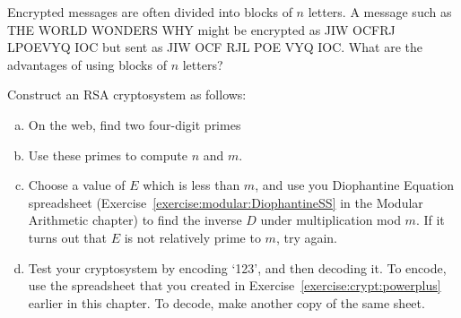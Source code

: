 % 
% 
% 
% 
% 
% 
% 
% 
% 
 
\begin{exercise}{} 
Encrypted messages are often divided into blocks of $n$ letters. A
message such as THE WORLD WONDERS WHY might be encrypted as 
JIW OCFRJ LPOEVYQ IOC but sent as JIW OCF RJL POE VYQ
IOC.  What are the advantages of using blocks of $n$ letters? 
 \end{exercise}
 
 
\begin{exercise}{}
Construct an RSA cryptosystem as follows:
\begin{enumerate}[(a)]
\item
On the web, find two four-digit primes
\item
Use these primes to compute $n$ and $m$.
\item
Choose a value of $E$ which is less than $m$, and use you Diophantine Equation spreadsheet (Exercise~\ref{exercise:modular:DiophantineSS} in the Modular Arithmetic chapter) to find the inverse $D$ under multiplication mod $m$.  If it turns out that $E$ is not relatively prime to $m$, try again.
\item
Test your cryptosystem by encoding `123', and then decoding it. To encode, use the spreadsheet that you 
created in Exercise~\ref{exercise:crypt:powerplus} earlier in this chapter. To decode, make another copy of the same sheet.
\end{enumerate}
\end{exercise} 
 
